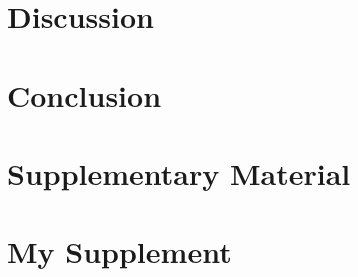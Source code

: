 \documentclass[a4paper]{article}
\begin{document}
\section{Discussion}

\section{Conclusion}


\newpage
\printbibliography

\newpage
\section*{Supplementary Material}

\renewcommand{\thesection}{S\arabic{section}}
\setcounter{section}{0}

\section{My Supplement}

\newpage
\thispagestyle{empty}

\end{document}
